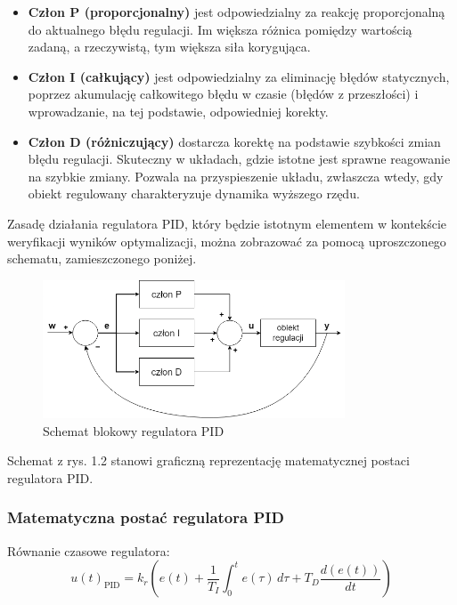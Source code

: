 \documentclass[a4paper,twoside,12pt]{book}
\begin{document}
\begin{itemize}
	\item \textbf{Człon P (proporcjonalny)} jest odpowiedzialny za reakcję proporcjonalną do aktualnego błędu regulacji. Im większa różnica pomiędzy wartością zadaną, a rzeczywistą, tym większa siła korygująca.
	\item \textbf{Człon I (całkujący)} jest odpowiedzialny za eliminację błędów statycznych, poprzez akumulację całkowitego błędu w czasie (błędów z przeszłości) i wprowadzanie, na tej podstawie, odpowiedniej korekty.
	\item \textbf{Człon D (różniczujący)} dostarcza korektę na podstawie szybkości zmian błędu regulacji. Skuteczny w układach, gdzie istotne jest sprawne reagowanie na szybkie zmiany. Pozwala na przyspieszenie układu, zwłaszcza wtedy, gdy obiekt regulowany charakteryzuje dynamika wyższego rzędu.
\end{itemize}

\noindent Zasadę działania regulatora PID, który będzie istotnym elementem w kontekście weryfikacji wyników optymalizacji, można zobrazować za pomocą uproszczonego schematu, zamieszczonego poniżej.

\begin{figure}[h]
	\centering
	\includegraphics[width=0.8\textwidth]{./img/PID.png}
	\caption{Schemat blokowy regulatora PID}
	\label{fig:PID}
\end{figure}

\noindent Schemat z rys. 1.2 stanowi graficzną reprezentację matematycznej postaci regulatora PID.

\newpage
\subsubsection{Matematyczna postać regulatora PID \cite{knospe2006pid}}
\noindent Równanie czasowe regulatora:
\begin{equation}
	u(t)_{\text{PID}} = k_r \left( e(t) + \frac{1}{T_I} \int_{0}^{t} e(\tau) \, d\tau + T_D \frac{d(e(t))}{dt} \right)
\end{equation}
\end{document}
